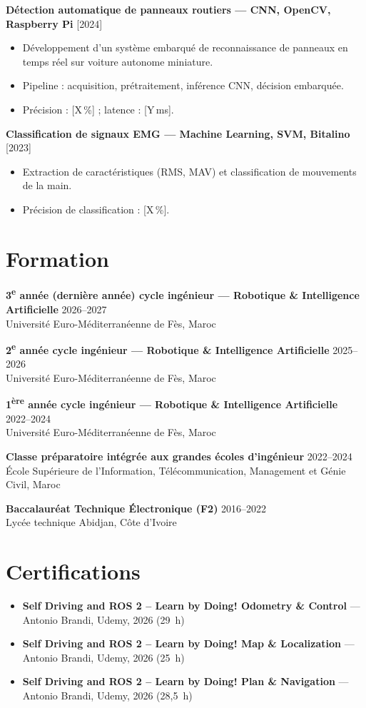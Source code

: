 \documentclass[11pt,a4paper]{article}
\newcommand{\cventry}[3]{%
    \textbf{#1} \hfill #2\\
    #3
}
\begin{document}
\cventry{Détection automatique de panneaux routiers — CNN, OpenCV, Raspberry Pi}{[2024]}{%
\begin{itemize}[leftmargin=*, nosep]
    \item Développement d'un système embarqué de reconnaissance de panneaux en temps réel sur voiture autonome miniature.
    \item Pipeline : acquisition, prétraitement, inférence CNN, décision embarquée.
    \item Précision : [X\,\%] ; latence : [Y\,ms].
\end{itemize}
}

\cventry{Classification de signaux EMG — Machine Learning, SVM, Bitalino}{[2023]}{%
\begin{itemize}[leftmargin=*, nosep]
    \item Extraction de caractéristiques (RMS, MAV) et classification de mouvements de la main.
    \item Précision de classification : [X\,\%].
\end{itemize}
}

\section{Formation}
\cventry{3\textsuperscript{e} année (dernière année) cycle ingénieur — Robotique \& Intelligence Artificielle}{2026--2027}{Université Euro-Méditerranéenne de Fès, Maroc}

\cventry{2\textsuperscript{e} année cycle ingénieur — Robotique \& Intelligence Artificielle}{2025--2026}{Université Euro-Méditerranéenne de Fès, Maroc}

\cventry{1\textsuperscript{ère} année cycle ingénieur — Robotique \& Intelligence Artificielle}{2022--2024}{Université Euro-Méditerranéenne de Fès, Maroc}

\cventry{Classe préparatoire intégrée aux grandes écoles d'ingénieur}{2022--2024}{École Supérieure de l'Information, Télécommunication, Management et Génie Civil, Maroc}

\cventry{Baccalauréat Technique Électronique (F2)}{2016--2022}{Lycée technique Abidjan, Côte d'Ivoire}

\section{Certifications}
\begin{itemize}[leftmargin=*, nosep]
    \item \textbf{Self Driving and ROS 2 -- Learn by Doing! Odometry \& Control} — Antonio Brandi, Udemy, 2026 (29~h)
    \item \textbf{Self Driving and ROS 2 -- Learn by Doing! Map \& Localization} — Antonio Brandi, Udemy, 2026 (25~h)
    \item \textbf{Self Driving and ROS 2 -- Learn by Doing! Plan \& Navigation} — Antonio Brandi, Udemy, 2026 (28,5~h)
\end{itemize}
\end{document}
